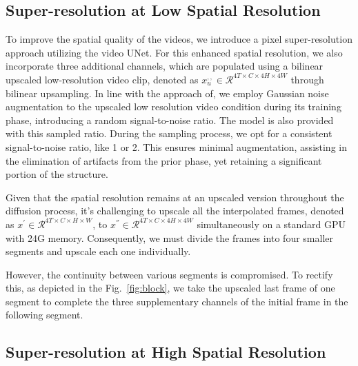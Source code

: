 \documentclass{article} \usepackage{iclr2024_conference,times}
\begin{document}
\subsection{Super-resolution at Low Spatial Resolution}
To improve the spatial quality of the videos, we introduce a pixel super-resolution approach utilizing the video UNet. For this enhanced spatial resolution, we also incorporate three additional channels, which are populated using a bilinear upscaled low-resolution video clip, denoted as  $x^{,,}_{u}\in  \mathcal{R}^{4T \times C \times 4H \times 4W}$ through bilinear upsampling. In line with the approach of\citep{ho2022video}, we employ Gaussian noise augmentation to the upscaled low resolution video condition during its training phase, introducing a random signal-to-noise ratio. The model is also provided with this sampled ratio. During the sampling process, we opt for a consistent signal-to-noise ratio, like 1 or 2. This ensures minimal augmentation, assisting in the elimination of artifacts from the prior phase, yet retaining a significant portion of the structure.

Given that the spatial resolution remains at an upscaled version throughout the diffusion process, it's challenging to upscale all the interpolated frames, denoted as \(x^{'} \in \mathcal{R}^{4T \times C \times H \times W}\), to \(x^{''} \in \mathcal{R}^{4T \times C \times 4H \times 4W}\) simultaneously on a standard GPU with  24G memory. Consequently, we must divide the frames into four smaller segments and upscale each one individually.  

However, the continuity between various segments is compromised. To rectify this, as depicted in the Fig.~\ref{fig:block}, we take the upscaled last frame of one segment to complete the three supplementary channels of the initial frame in the following segment.

\vspace{-3mm}

\subsection{Super-resolution at High Spatial Resolution}
\label{section3.6}
\end{document}
